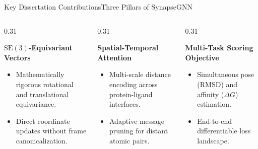 \documentclass[10pt,aspectratio=169]{beamer}
\begin{document}
\begin{frame}{Key Dissertation Contributions}{Three Pillars of SynapseGNN}
  \begin{columns}[T]
    \begin{column}{0.31\textwidth}
      \begin{tcolorbox}[highlightbox,title={\faLayerGroup \quad Pillar I}]
        \scriptsize
        \textbf{$\mathrm{SE}(3)$-Equivariant Vectors}
        \vspace{3pt}
        \begin{itemize}
          \item Mathematically rigorous rotational and translational equivariance.
          \item Direct coordinate updates without frame canonicalization.
        \end{itemize}
      \end{tcolorbox}
    \end{column}
    
    \begin{column}{0.31\textwidth}
      \begin{tcolorbox}[defensebox,title={\faProjectDiagram \quad Pillar II}]
        \scriptsize
        \textbf{Spatial-Temporal Attention}
        \vspace{3pt}
        \begin{itemize}
          \item Multi-scale distance encoding across protein-ligand interfaces.
          \item Adaptive message pruning for distant atomic pairs.
        \end{itemize}
      \end{tcolorbox}
    \end{column}

    \begin{column}{0.31\textwidth}
      \begin{tcolorbox}[alertbox,title={\faAward \quad Pillar III}]
        \scriptsize
        \textbf{Multi-Task Scoring Objective}
        \vspace{3pt}
        \begin{itemize}
          \item Simultaneous pose ($\text{RMSD}$) and affinity ($\Delta G$) estimation.
          \item End-to-end differentiable loss landscape.
        \end{itemize}
      \end{tcolorbox}
    \end{column}
  \end{columns}


\end{frame}
\end{document}
